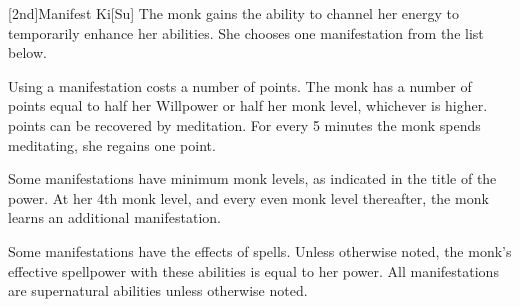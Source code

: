 [2nd]{Manifest Ki}[Su]
The monk gains the ability to channel her \ki energy to temporarily enhance her abilities.
She chooses one \ki manifestation from the list below.

Using a \ki manifestation costs a number of \ki points.
The monk has a number of \ki points equal to half her Willpower or half her monk level, whichever is higher.
\Ki points can be recovered by meditation.
For every 5 minutes the monk spends meditating, she regains one \ki point.

Some \ki manifestations have minimum monk levels, as indicated in the title of the power.
At her 4th monk level, and every even monk level thereafter, the monk learns an additional \ki manifestation.

Some \ki manifestations have the effects of spells.
Unless otherwise noted, the monk's effective spellpower with these abilities is equal to her \ki power.
All \ki manifestations are supernatural abilities unless otherwise noted.

